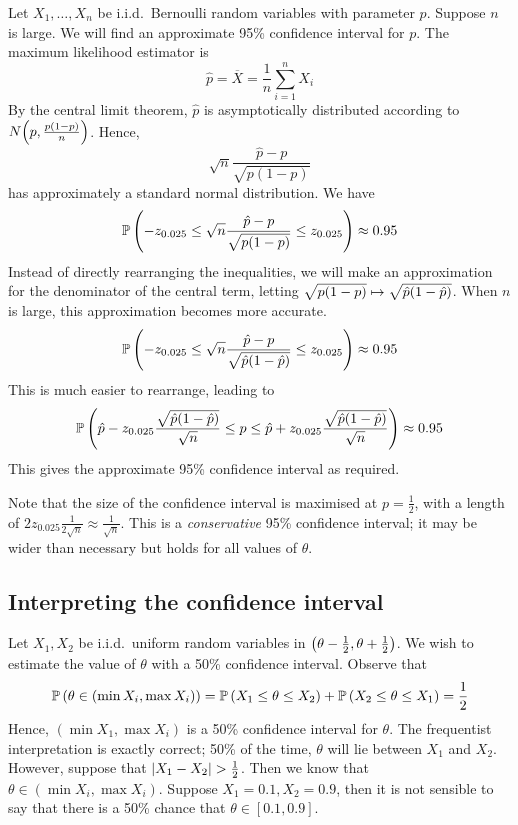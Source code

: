 \begin{example}
	Let \( X_1, \dots, X_n \) be i.i.d.\ Bernoulli random variables with parameter \( p \).
	Suppose \( n \) is large.
	We will find an approximate 95\% confidence interval for \( p \).
	The maximum likelihood estimator is
	\[
		\hat p = \overline X = \frac{1}{n} \sum_{i=1}^n X_i
	\]
	By the central limit theorem, \( \hat p \) is asymptotically distributed according to \( N\qty(p, \frac{p(1-p)}{n}) \).
	Hence,
	\[
		\sqrt{n}\frac{\hat p - p}{\sqrt{p(1-p)}}
	\]
	has approximately a standard normal distribution.
	We have
	\[
		\mathbb{P}\left({-z_{0.025} \leq \sqrt{n}\frac{\hat p - p}{\sqrt{p(1-p)}} \leq z_{0.025}}\right) \approx 0.95
	\]
	Instead of directly rearranging the inequalities, we will make an approximation for the denominator of the central term, letting \( \sqrt{p(1-p)} \mapsto \sqrt{\hat p\qty(1-\hat p)} \).
	When \( n \) is large, this approximation becomes more accurate.
	\[
		\mathbb{P}\left({-z_{0.025} \leq \sqrt{n}\frac{\hat p - p}{\sqrt{\hat p\qty(1-\hat p)}} \leq z_{0.025}}\right) \approx 0.95
	\]
	This is much easier to rearrange, leading to
	\[
		\mathbb{P}\left({\hat p - z_{0.025}\frac{\sqrt{\hat p\qty(1-\hat p)}}{\sqrt{n}} \leq p \leq \hat p + z_{0.025}\frac{\sqrt{\hat p\qty(1-\hat p)}}{\sqrt{n}}}\right) \approx 0.95
	\]
	This gives the approximate 95\% confidence interval as required.
\end{example}
\begin{remark}
	Note that the size of the confidence interval is maximised at \( p = \frac{1}{2} \), with a length of \( 2z_{0.025} \frac{1}{2\sqrt{n}} \approx \frac{1}{\sqrt{n}} \).
	This is a \textit{conservative} 95\% confidence interval; it may be wider than necessary but holds for all values of \( \theta \).
\end{remark}

\subsection{Interpreting the confidence interval}
\begin{example}
	Let \( X_1, X_2 \) be i.i.d.\ uniform random variables in \( \qty(\theta - \frac{1}{2}, \theta + \frac{1}{2}) \).
	We wish to estimate the value of \( \theta \) with a 50\% confidence interval.
	Observe that
	\[
		\mathbb{P}\left({\theta \in (\min X_i, \max X_i)}\right) = \mathbb{P}\left({X_1 \leq \theta \leq X_2}\right) + \mathbb{P}\left({X_2 \leq \theta \leq X_1}\right) = \frac{1}{2}
	\]
	Hence, \( (\min X_1, \max X_i) \) is a 50\% confidence interval for \( \theta \).
	The frequentist interpretation is exactly correct; 50\% of the time, \( \theta \) will lie between \( X_1 \) and \( X_2 \).
	However, suppose that \( \abs{X_1 - X_2} > \frac{1}{2} \).
	Then we know that \( \theta \in (\min X_i, \max X_i) \).
	Suppose \( X_1 = 0.1, X_2 = 0.9 \), then it is not sensible to say that there is a 50\% chance that \( \theta \in [0.1, 0.9] \).
\end{example}
